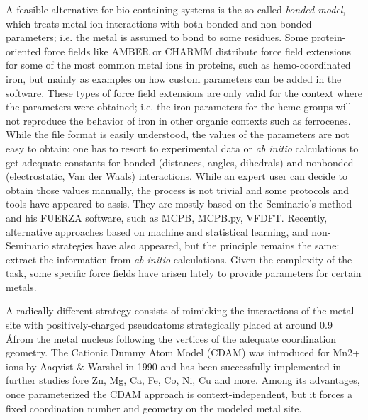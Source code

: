 A feasible alternative for bio-containing systems is the so-called \textit{bonded model}, which treats metal ion interactions with both bonded and non-bonded parameters; i.e. the metal is assumed to bond to some residues. Some protein-oriented force fields like AMBER\cite{amber} or CHARMM\cite{brooks1983} distribute force field extensions for some of the most common metal ions in proteins, such as hemo-coordinated iron, but mainly as examples on how custom parameters can be added in the software. These types of force field extensions are only valid for the context where the parameters were obtained; i.e. the iron parameters for the heme groups will not reproduce the behavior of iron in other organic contexts such as ferrocenes. While the file format is easily understood, the values of the parameters are not easy to obtain: one has to resort to experimental data or \textit{ab initio} calculations to get adequate constants for bonded (distances, angles, dihedrals) and nonbonded (electrostatic, Van der Waals) interactions. While an expert user can decide to obtain those values manually, the process is not trivial and some protocols and tools have appeared to assis. They are mostly based on the Seminario's method and his FUERZA software,\cite{Seminario1996} such as MCPB, MCPB.py,\cite{Li2016} VFDFT.\cite{zheng2016} Recently, alternative approaches based on machine and statistical learning, \cite{fracchia2017,li2017b} and non-Seminario strategies\cite{Burger2012, allen2017} have also appeared, but the principle remains the same: extract the information from \textit{ab initio} calculations. Given the complexity of the task, some specific force fields have arisen lately to provide parameters for certain metals.\cite{Huey_2007,Bureekaew_2013,Addicoat_2014,Landis_2007,Shi_2003,Rappe_1993,Nielson_2005}

A radically different strategy consists of mimicking the interactions of the metal site with positively-charged pseudoatoms strategically placed at around 0.9 \AA from the metal nucleus following the vertices of the adequate coordination geometry. The Cationic Dummy Atom Model (CDAM) was introduced for Mn2+ ions by Aaqvist $\&$  Warshel in 1990\cite{aaqvist1990} and has been successfully implemented in further studies fore Zn, Mg, Ca, Fe, Co, Ni, Cu and more.\cite{duarte2014,lu2012proteins,Oelschlaeger_2007,Saxena_2013,Saxena_2014,Liao_2015,Pang_1999} Among its advantages, once parameterized the CDAM approach is context-independent, but it forces a fixed coordination number and geometry on the modeled metal site.

